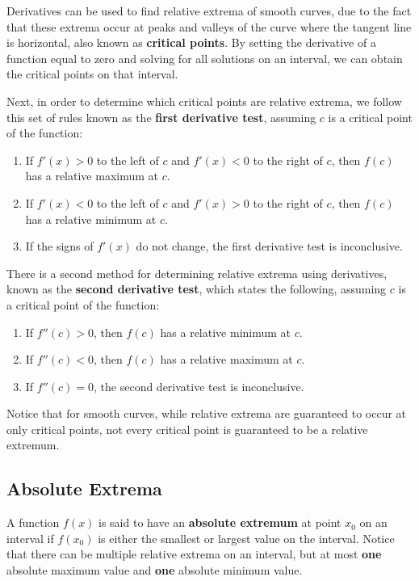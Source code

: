 \documentclass[11pt]{article}
\begin{document}
Derivatives can be used to find relative extrema of smooth curves, due to the fact that these extrema occur at peaks and valleys of the curve where the tangent line is horizontal, also known as \textbf{critical points}. By setting the derivative of a function equal to zero and solving for all solutions on an interval, we can obtain the critical points on that interval. 

Next, in order to determine which critical points are relative extrema, we follow this set of rules known as the \textbf{first derivative test}, assuming $c$ is a critical point of the function: 

\begin{enumerate}
  \item If \(f'(x) > 0\) to the left of \(c\) and \(f'(x) < 0\) to the right of \(c\), then \(f(c)\) has a relative maximum at \(c\).
  \item If \(f'(x) < 0\) to the left of \(c\) and \(f'(x) > 0\) to the right of \(c\), then \(f(c)\) has a relative minimum at \(c\).
  \item If the signs of \(f'(x)\) do not change, the first derivative test is inconclusive.
\end{enumerate}

There is a second method for determining relative extrema using derivatives, known as the \textbf{second derivative test}, which states the following, assuming $c$ is a critical point of the function: 

\begin{enumerate}
  \item If \(f''(c) > 0\), then \(f(c)\) has a relative minimum at \(c\).
  \item If \(f''(c) < 0\), then \(f(c)\) has a relative maximum at \(c\).
  \item If \(f''(c) = 0\), the second derivative test is inconclusive.
\end{enumerate}

Notice that for smooth curves, while relative extrema are guaranteed to occur at only critical points, not every critical point is guaranteed to be a relative extremum.

\subsection{Absolute Extrema}
A function $f(x)$ is said to have an \textbf{absolute extremum} at point $x_0$ on an interval if $f(x_0)$ is either the smallest or largest value on the interval. Notice that there can be multiple relative extrema on an interval, but at most \textbf{one} absolute maximum value and \textbf{one} absolute minimum value.
\end{document}
